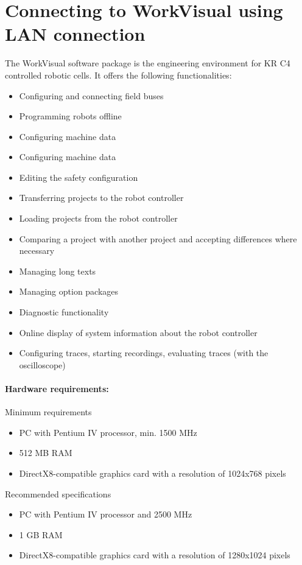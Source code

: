 		\section{Connecting to WorkVisual using LAN connection}
		The WorkVisual software package is the engineering environment for KR C4 controlled robotic cells. It offers the following functionalities:
		\begin{itemize}
			\item Configuring and connecting field buses
			\item Programming robots offline
			\item Configuring machine data
			\item Configuring machine data
			\item Editing the safety configuration
			\item Transferring projects to the robot controller
			\item Loading projects from the robot controller
			\item Comparing a project with another project and accepting differences where necessary
			\item Managing long texts
			\item Managing option packages
			\item Diagnostic functionality
			\item Online display of system information about the robot controller
			\item Configuring traces, starting recordings, evaluating traces (with the oscilloscope)
		\end{itemize}
		
			\paragraph{Hardware requirements:}
			Minimum requirements 
				\begin{itemize}
					\item PC with Pentium IV processor, min. 1500 MHz
					\item 512 MB RAM
					\item DirectX8-compatible graphics card with a resolution of 1024x768 pixels
				\end{itemize}
			Recommended specifications
				\begin{itemize}
					\item PC with Pentium IV processor and 2500 MHz
					\item 1 GB RAM
					\item DirectX8-compatible graphics card with a resolution of 1280x1024 pixels
				\end{itemize}
